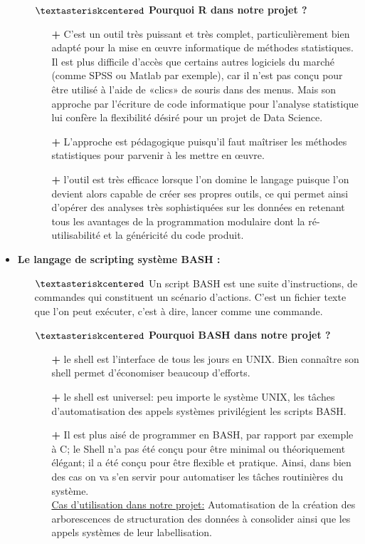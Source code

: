 \begin{itemize}
\begin{itemize}
					\item[$\textasteriskcentered$] \textbf{Pourquoi R dans notre projet ?}
					\begin{itemize}
						\item[\textbf{+}] C’est un outil très puissant et très complet, particulièrement bien adapté pour la mise en œuvre informatique de méthodes statistiques. Il est plus difficile d’accès que certains autres logiciels du marché (comme SPSS ou Matlab par exemple), car il n’est pas conçu pour être utilisé à l’aide de «clics» de souris dans des menus. Mais son approche par l'écriture de code informatique pour l'analyse statistique lui confère la flexibilité désiré pour un projet de Data Science.
						\item[\textbf{+}] L’approche est pédagogique puisqu’il faut maîtriser les méthodes statistiques pour parvenir à les mettre en œuvre.
						\item[\textbf{+}] l’outil est très efficace lorsque l’on domine le langage puisque l’on devient alors capable de créer ses propres outils, ce qui permet ainsi d’opérer des analyses très sophistiquées sur les données en retenant tous les avantages de la programmation modulaire dont la ré-utilisabilité et la généricité du code produit.
					\end{itemize}
				\end{itemize}
			\item
			\textbf{Le langage de scripting système BASH : } 
				\begin{itemize}
					\item[$\textasteriskcentered$] Un script BASH est une suite d’instructions, de commandes qui constituent un scénario d'actions. C’est un fichier texte que l’on peut exécuter, c’est à dire, lancer comme une commande.
					\item[$\textasteriskcentered$] \textbf{Pourquoi BASH dans notre projet ?}
					\begin{itemize}
						\item[\textbf{+}] le shell est l'interface de tous les jours en UNIX. Bien connaître son shell permet d'économiser beaucoup d'efforts.
						\item[\textbf{+}] le shell est universel: peu importe le système UNIX, les tâches d'automatisation des appels systèmes privilégient les scripts BASH.
						\item[\textbf{+}] Il est plus aisé de programmer en BASH, par rapport par exemple à C; le Shell n'a pas été conçu pour être minimal ou théoriquement élégant; il a été conçu pour être flexible et pratique. Ainsi, dans bien des cas on va s'en servir pour automatiser les tâches routinières du système.\\
						\underline{Cas d'utilisation dans notre projet:} Automatisation de la création des arborescences de structuration des données à consolider ainsi que les appels systèmes de leur labellisation.
					\end{itemize}
				\end{itemize}
		\end{itemize}
		
